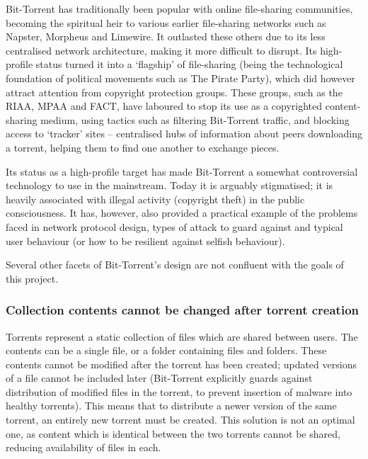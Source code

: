 \documentclass[12pt,a4paper,]{adreport}
\begin{document}
Bit-Torrent has traditionally been popular with online file-sharing
communities, becoming the spiritual heir to various earlier file-sharing
networks such as Napster, Morpheus and Limewire. It outlasted these
others due to its less centralised network architecture, making it more
difficult to disrupt. Its high-profile status turned it into a
`flagship' of file-sharing (being the technological foundation of
political movements such as The Pirate Party), which did however attract
attention from copyright protection groups. These groups, such as the
RIAA, MPAA and FACT, have laboured to stop its use as a copyrighted
content-sharing medium, using tactics such as filtering Bit-Torrent
traffic, and blocking access to `tracker' sites -- centralised hubs of
information about peers downloading a torrent, helping them to find one
another to exchange pieces.

Its status as a high-profile target has made Bit-Torrent a somewhat
controversial technology to use in the mainstream. Today it is arguably
stigmatised; it is heavily associated with illegal activity (copyright
theft) in the public consciousness. It has, however, also provided a
practical example of the problems faced in network protocol design,
types of attack to guard against and typical user behaviour (or how to
be resilient against selfish behaviour).

Several other facets of Bit-Torrent's design are not confluent with the
goals of this project.

\subsubsection{Collection contents cannot be changed after torrent
creation}\label{collection-contents-cannot-be-changed-after-torrent-creation}

Torrents represent a static collection of files which are shared between
users. The contents can be a single file, or a folder containing files
and folders. These contents cannot be modified after the torrent has
been created; updated versions of a file cannot be included later
(Bit-Torrent explicitly guards against distribution of modified files in
the torrent, to prevent insertion of malware into healthy torrents).
This means that to distribute a newer version of the same torrent, an
entirely new torrent must be created. This solution is not an optimal
one, as content which is identical between the two torrents cannot be
shared, reducing availability of files in each.
\end{document}
